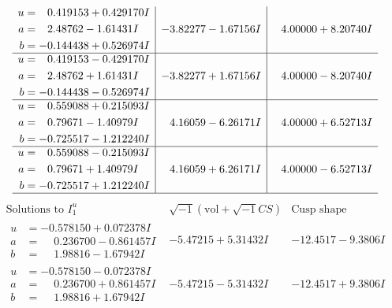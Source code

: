 \documentclass[1p]{elsarticle_modified}
\theoremstyle{definition}
\newcommand{\I}{\sqrt{-1}}
\begin{document}
$$\begin{array}{c|c|c}
\begin{aligned}
u &= \phantom{-}0.419153 + 0.429170 I \\
a &= \phantom{-}2.48762 - 1.61431 I \\
b &= -0.144438 + 0.526974 I\end{aligned}
 & -3.82277 - 1.67156 I & \phantom{-}4.00000 + 8.20740 I \\ \hline\begin{aligned}
u &= \phantom{-}0.419153 - 0.429170 I \\
a &= \phantom{-}2.48762 + 1.61431 I \\
b &= -0.144438 - 0.526974 I\end{aligned}
 & -3.82277 + 1.67156 I & \phantom{-}4.00000 - 8.20740 I \\ \hline\begin{aligned}
u &= \phantom{-}0.559088 + 0.215093 I \\
a &= \phantom{-}0.79671 - 1.40979 I \\
b &= -0.725517 - 1.212240 I\end{aligned}
 & \phantom{-}4.16059 - 6.26171 I & \phantom{-}4.00000 + 6.52713 I \\ \hline\begin{aligned}
u &= \phantom{-}0.559088 - 0.215093 I \\
a &= \phantom{-}0.79671 + 1.40979 I \\
b &= -0.725517 + 1.212240 I\end{aligned}
 & \phantom{-}4.16059 + 6.26171 I & \phantom{-}4.00000 - 6.52713 I\\
 \hline 
 \end{array}$$\newpage$$\begin{array}{c|c|c}  
\text{Solutions to }I^u_{1}& \I (\text{vol} + \sqrt{-1}CS) & \text{Cusp shape}\\
 \hline 
\begin{aligned}
u &= -0.578150 + 0.072378 I \\
a &= \phantom{-}0.236700 - 0.861457 I \\
b &= \phantom{-}1.98816 - 1.67942 I\end{aligned}
 & -5.47215 + 5.31432 I & -12.4517 - 9.3806 I \\ \hline\begin{aligned}
u &= -0.578150 - 0.072378 I \\
a &= \phantom{-}0.236700 + 0.861457 I \\
b &= \phantom{-}1.98816 + 1.67942 I\end{aligned}
 & -5.47215 - 5.31432 I & -12.4517 + 9.3806 I \\ \hline\begin{aligned}

\end{aligned}
\end{array}$$
\end{document}
